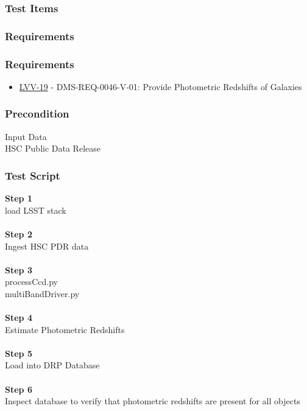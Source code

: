 \hypertarget{test-items-10}{%
\subsubsection{Test Items}\label{test-items-10}}

\hypertarget{requirements-20}{%
\subsubsection{Requirements}\label{requirements-20}}

\hypertarget{requirements-21}{%
\subsubsection{Requirements}\label{requirements-21}}

\begin{itemize}
\tightlist
\item
  \href{https://jira.lsstcorp.org/browse/LVV-19}{LVV-19} -
  DMS-REQ-0046-V-01: Provide Photometric Redshifts of Galaxies
\end{itemize}

\hypertarget{precondition-3}{%
\subsubsection{Precondition}\label{precondition-3}}

Input Data\\
HSC Public Data Release

\hypertarget{test-script-10}{%
\subsubsection{Test Script}\label{test-script-10}}

\textbf{Step 1}\\
load LSST stack\\
~\\
\textbf{Step 2}\\
Ingest HSC PDR data\\
~\\
\textbf{Step 3}\\
processCcd.py\\
multiBandDriver.py\\
~\\
\textbf{Step 4}\\
Estimate Photometric Redshifts\\
~\\
\textbf{Step 5}\\
Load into DRP Database\\
~\\
\textbf{Step 6}\\
Inspect database to verify that photometric redshifts are present for
all objects\\
~\\

